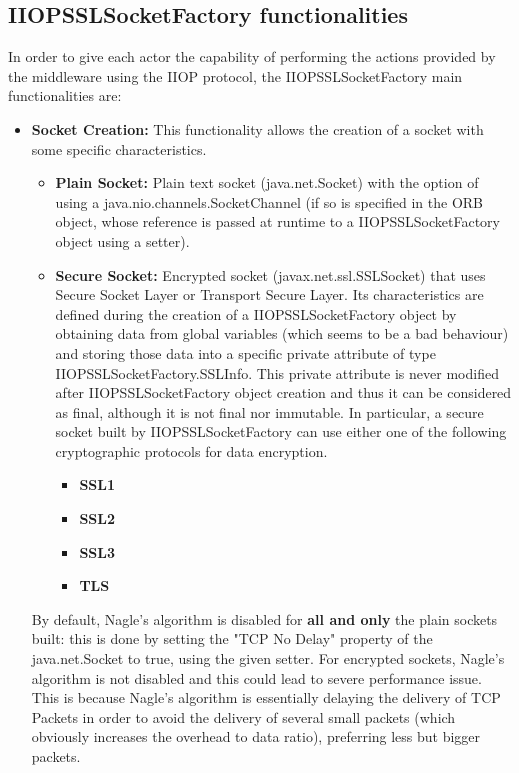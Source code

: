\subsection{IIOPSSLSocketFactory functionalities}
In order to give each actor the capability of performing the actions provided by the middleware using the IIOP protocol, the IIOPSSLSocketFactory main functionalities are:
\begin{itemize}
	\item \textbf{Socket Creation:}
		This functionality allows the creation of a socket with some specific characteristics.
		\begin{itemize}
			\item \textbf{Plain Socket:}
				Plain text socket (java.net.Socket) with the option of using a java.nio.channels.SocketChannel (if so is specified in the ORB object, whose reference is passed at runtime to a IIOPSSLSocketFactory object using a setter).
			\item \textbf{Secure Socket:}
				Encrypted socket (javax.net.ssl.SSLSocket) that uses Secure Socket Layer or Transport Secure Layer.
				Its characteristics are defined during the creation of a IIOPSSLSocketFactory object by obtaining data from global variables (which seems to be a bad behaviour) and storing those data into a specific private attribute of type IIOPSSLSocketFactory.SSLInfo.
				This private attribute is never modified after IIOPSSLSocketFactory object creation and thus it can be considered as final, although it is not final nor immutable.
				In particular, a secure socket built by IIOPSSLSocketFactory can use either one of the following cryptographic protocols for data encryption.
				\begin{itemize}
					\item \textbf{SSL1} 
					\item \textbf{SSL2}
					\item \textbf{SSL3}
					\item \textbf{TLS}
				\end{itemize}
		\end{itemize}
		By default, Nagle's algorithm is disabled for \textbf{all and only} the plain sockets built: this is done by setting the "TCP No Delay" property of the java.net.Socket to true, using the given setter.
		For encrypted sockets, Nagle's algorithm is not disabled and this could lead to severe performance issue.
		This is because Nagle's algorithm is essentially delaying the delivery of TCP Packets in order to avoid the delivery of several small packets (which obviously increases the overhead to data ratio), preferring less but bigger packets.

\end{itemize}
